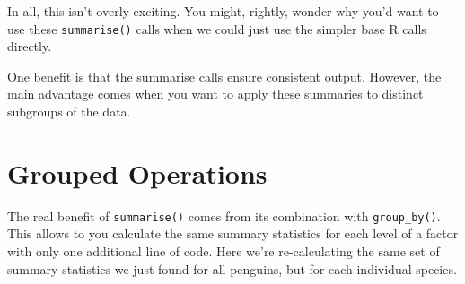 \documentclass[
  12pt,
]{book}
\begin{document}
In all, this isn't overly exciting. You might, rightly, wonder why you'd want to use these \texttt{summarise()} calls when we could just use the simpler base R calls directly.

One benefit is that the summarise calls ensure consistent output. However, the main advantage comes when you want to apply these summaries to distinct subgroups of the data.

\hypertarget{grouped-operations}{%
\section{Grouped Operations}\label{grouped-operations}}

The real benefit of \texttt{summarise()} comes from its combination with \texttt{group\_by()}. This allows to you calculate the same summary statistics for each level of a factor with only one additional line of code. Here we're re-calculating the same set of summary statistics we just found for all penguins, but for each individual species.
\end{document}
